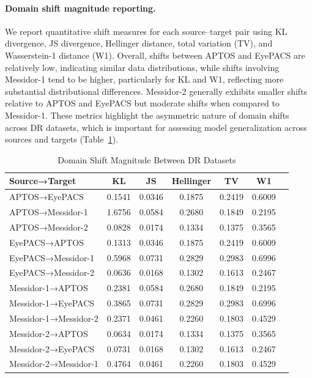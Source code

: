 \documentclass{article}
\begin{document}
\paragraph{Domain shift magnitude reporting.}
We report quantitative shift measures for each source–target pair using KL divergence, JS divergence, Hellinger distance, total variation (TV), and Wasserstein-1 distance (W1). Overall, shifts between APTOS and EyePACS are relatively low, indicating similar data distributions, while shifts involving Messidor-1 tend to be higher, particularly for KL and W1, reflecting more substantial distributional differences. Messidor-2 generally exhibits smaller shifts relative to APTOS and EyePACS but moderate shifts when compared to Messidor-1. These metrics highlight the asymmetric nature of domain shifts across DR datasets, which is important for assessing model generalization across sources and targets (Table~\ref{tab:domain_shift}).
\begin{table}[htbp]
\scriptsize
\centering
\caption{Domain Shift Magnitude Between DR Datasets}
\label{tab:domain_shift}
\begin{tabular}{lcccccc}
\hline
\textbf{Source→Target} & \textbf{KL} & \textbf{JS} & \textbf{Hellinger} & \textbf{TV} & \textbf{W1} \\
\hline
APTOS→EyePACS & 0.1541 & 0.0346 & 0.1875 & 0.2419 & 0.6009 \\
APTOS→Messidor-1 & 1.6756 & 0.0584 & 0.2680 & 0.1849 & 0.2195 \\
APTOS→Messidor-2 & 0.0828 & 0.0174 & 0.1334 & 0.1375 & 0.3565 \\
EyePACS→APTOS & 0.1313 & 0.0346 & 0.1875 & 0.2419 & 0.6009 \\
EyePACS→Messidor-1 & 0.5968 & 0.0731 & 0.2829 & 0.2983 & 0.6996 \\
EyePACS→Messidor-2 & 0.0636 & 0.0168 & 0.1302 & 0.1613 & 0.2467 \\
Messidor-1→APTOS & 0.2381 & 0.0584 & 0.2680 & 0.1849 & 0.2195 \\
Messidor-1→EyePACS & 0.3865 & 0.0731 & 0.2829 & 0.2983 & 0.6996 \\
Messidor-1→Messidor-2 & 0.2371 & 0.0461 & 0.2260 & 0.1803 & 0.4529 \\
Messidor-2→APTOS & 0.0634 & 0.0174 & 0.1334 & 0.1375 & 0.3565 \\
Messidor-2→EyePACS & 0.0731 & 0.0168 & 0.1302 & 0.1613 & 0.2467 \\
Messidor-2→Messidor-1 & 0.4764 & 0.0461 & 0.2260 & 0.1803 & 0.4529 \\
\hline
\end{tabular}
\end{table}
\end{document}
